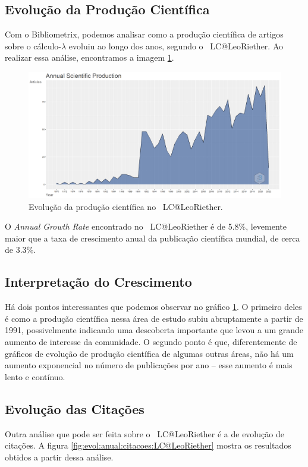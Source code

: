 \subsection{Evolução da Produção Científica}
Com o Bibliometrix, podemos analisar como a produção científica de artigos sobre o cálculo-$\lambda$ evoluiu ao longo dos anos, segundo o \dataset\  LC@LeoRiether. Ao realizar essa análise, encontramos a imagem \ref{fig:evol:anual:LC@LeoRiether}. 

\begin{figure}
    \centering
    \includegraphics[width=1\textwidth]{experiments/LeoRiether/AnaliseBibliometrica/LambdaCalculus/WoS-20220208/Images/AnnualScientificProduction.png}
    \caption{Evolução da produção científica no \dataset\   LC@LeoRiether.}
    \label{fig:evol:anual:LC@LeoRiether}
\end{figure}

O \textit{Annual Growth Rate} encontrado no \dataset\  LC@LeoRiether é de 5.8\%, levemente maior que a taxa de crescimento anual da publicação científica mundial, de cerca de 3.3\%.

\subsection{Interpretação do Crescimento}
Há dois pontos interessantes que podemos observar no gráfico \ref{fig:evol:anual:LC@LeoRiether}. O primeiro deles é como a produção científica nessa área de estudo subiu abruptamente a partir de 1991, possivelmente indicando uma descoberta importante que levou a um grande aumento de interesse da comunidade. O segundo ponto é que, diferentemente de gráficos de evolução de produção científica de algumas outras áreas, não há um aumento exponencial no número de publicações por ano -- esse aumento é mais lento e contínuo.

\subsection{Evolução das Citações}
Outra análise que pode ser feita sobre o \dataset\  LC@LeoRiether é a de evolução de citações. A figura \ref{fig:evol:anual:citacoes:LC@LeoRiether} mostra os resultados obtidos a partir dessa análise.

